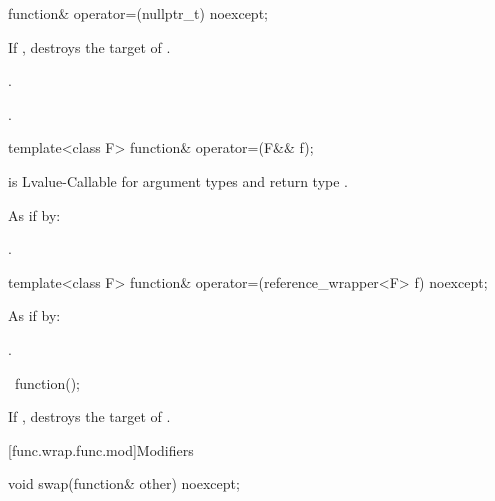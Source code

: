 %
\begin{itemdecl}
function& operator=(nullptr_t) noexcept;
\end{itemdecl}

\begin{itemdescr}
\pnum
\effects
If , destroys the target of .

\pnum
\ensures
{}.

\pnum
\returns
{}.
\end{itemdescr}

%
\begin{itemdecl}
template<class F> function& operator=(F&& f);
\end{itemdecl}

\begin{itemdescr}
\pnum
\constraints
{} is Lvalue-Callable
for argument types  and return type .

\pnum
\effects
As if by: 

\pnum
\returns
{}.
\end{itemdescr}

%
\begin{itemdecl}
template<class F> function& operator=(reference_wrapper<F> f) noexcept;
\end{itemdecl}

\begin{itemdescr}
\pnum
\effects
As if by: 

\pnum
\returns
{}.
\end{itemdescr}

%
\begin{itemdecl}
~function();
\end{itemdecl}

\begin{itemdescr}
\pnum
\effects
If , destroys the target of .
\end{itemdescr}

[func.wrap.func.mod]{Modifiers}

%
\begin{itemdecl}
void swap(function& other) noexcept;
\end{itemdecl}

